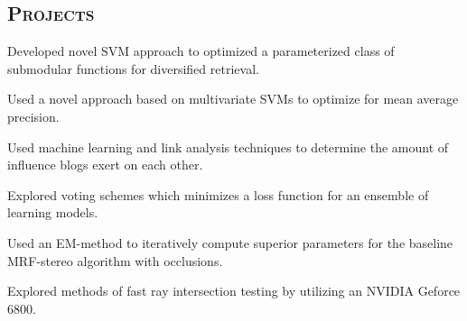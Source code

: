 \begin{resume}
\section{\textsc{Projects}}

\begin{position}
Developed novel SVM approach to optimized a parameterized class of submodular functions for diversified retrieval.
\end{position}

\begin{position}
Used a novel approach based on multivariate SVMs to optimize for mean average precision.
\end{position}

\begin{position}
Used machine learning and link analysis techniques to determine the amount of influence blogs exert on each other.
\end{position}

\begin{position}
Explored voting schemes which minimizes a loss function for an ensemble of learning models. 
\end{position}

\begin{position}
Used an EM-method to iteratively compute superior parameters for the baseline MRF-stereo algorithm with occlusions.
\end{position}

\begin{position}
Explored methods of fast ray intersection testing by utilizing an NVIDIA Geforce 6800.
\end{position}



\end{resume}
